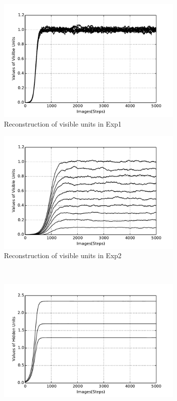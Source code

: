 \begin{figure}
\begin{subfigure}[t]{0.4\textwidth}
			\includegraphics[width=\textwidth]{pics_ae/exp1_recon_noisy.pdf}
			\caption{Reconstruction of visible units in Exp1}
		\end{subfigure}
		\begin{subfigure}[t]{0.4\textwidth}
			\includegraphics[width=\textwidth]{pics_ae/exp2_recon_noisy.pdf}
			\caption{Reconstruction of visible units in Exp2}
		\end{subfigure}\\
		\begin{subfigure}[t]{0.4\textwidth}
			\includegraphics[width=\textwidth]{pics_ae/exp1_hid_noisy.pdf}

\end{subfigure}
\end{figure}
